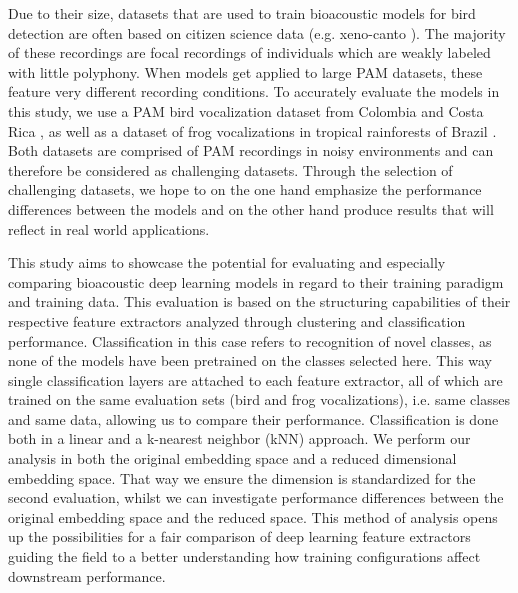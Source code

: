 Due to their size, datasets that are used to train bioacoustic models for bird detection are often based on citizen science data (e.g. xeno-canto \cite{xeno-canto_xeno-canto_2025}).
The majority of these recordings are focal recordings of individuals which are weakly labeled with little polyphony.
When models get applied to large PAM datasets, these feature very different recording conditions.
To accurately evaluate the models in this study, we use a PAM bird vocalization dataset from Colombia and Costa Rica \cite{vega-hidalgo_collection_2023}, as well as a dataset of frog vocalizations in tropical rainforests of Brazil \cite{canas_dataset_2023}.
Both datasets are comprised of PAM recordings in noisy environments and can therefore be considered as challenging datasets.
Through the selection of challenging datasets, we hope to on the one hand emphasize the performance differences between the models and on the other hand produce results that will reflect in real world applications.

This study aims to showcase the potential for evaluating and especially comparing bioacoustic deep learning models in regard to their training paradigm and training data.
This evaluation is based on the structuring capabilities of their respective feature extractors analyzed through clustering and classification performance.
Classification in this case refers to recognition of novel classes, as none of the models have been pretrained on the classes selected here.
This way single classification layers are attached to each feature extractor, all of which are trained on the same evaluation sets (bird and frog vocalizations), i.e. same classes and same data, allowing us to compare their performance.
Classification is done both in a linear and a k-nearest neighbor (kNN) approach.
We perform our analysis in both the original embedding space and a reduced dimensional embedding space. 
That way we ensure the dimension is standardized for the second evaluation, whilst we can investigate performance differences between the original embedding space and the reduced space.
This method of analysis opens up the possibilities for a fair comparison of deep learning feature extractors guiding the field to a better understanding how training configurations affect downstream performance.




